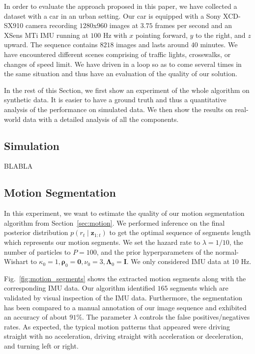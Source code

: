 In order to evaluate the approach proposed in this paper, we have collected
a dataset with a car in an urban setting. Our car is equipped with a Sony
XCD-SX910 camera recording $1280$x$960$ images at $3.75$ frames per second and
an XSens MTi IMU running at $100$ Hz with $x$ pointing forward, $y$ to the
right, and $z$ upward. The sequence contains $8218$ images and lasts around $40$
minutes. We have encountered different scenes comprising of traffic lights,
crosswalks, or changes of speed limit. We have driven in a loop so as to come
several times in the same situation and thus have an evaluation of the quality
of our solution.

In the rest of this Section, we first show an experiment of the whole algorithm
on synthetic data. It is easier to have a ground truth and thus a quantitative
analysis of the performance on simulated data. We then show the results on
real-world data with a detailed analysis of all the components.

\subsection{Simulation}
BLABLA

\subsection{Motion Segmentation}
In this experiment, we want to estimate the quality of our motion segmentation
algorithm from Section~\ref{sec:motion}. We performed inference on the
final posterior distribution $p(r_t\mid \mathbf{z}_{1:t})$ to get the optimal
sequence of segments length which represents our motion segments. We set the
hazard rate to $\lambda=1/10$, the number of particles to $P=100$, and the prior
hyperparameters of the normal-Wishart to $\kappa_0=1,
\boldsymbol{\rho}_0=\mathbf{0},\nu_0=3,\boldsymbol{\Lambda}_0=\mathbf{I}$. We
only considered IMU data at $10$ Hz.

Fig.~\ref{fig:motion_segments} shows the extracted motion segments along with
the corresponding IMU data. Our algorithm identified $165$ segments which are
validated by visual inspection of the IMU data. Furthermore, the segmentation
has been compared to a manual annotation of our image sequence and exhibited an
accuracy of about $91\%$. The parameter $\lambda$ controls the false
positives/negatives rates. As expected, the typical motion patterns that
appeared were driving straight with no acceleration, driving straight with
acceleration or deceleration, and turning left or right.

